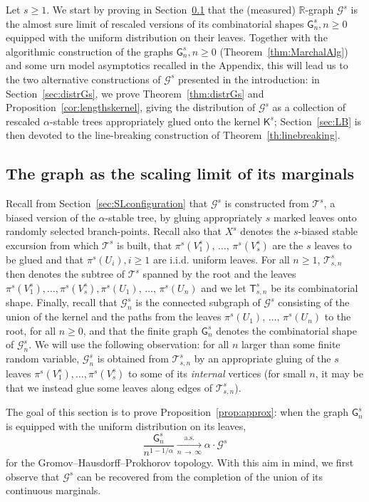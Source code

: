 \documentclass[10pt]{amsart}
\theoremstyle{definition}\newtheorem{defi}[theo]{Definition}\newtheorem{rema}[theo]{Remark}\newtheorem{exam}[theo]{Example}\newtheorem{exem}[theo]{Example}\newtheorem{nota}[theo]{Notation}
\newcommand{\cG}{\mathcal{G}}
\newcommand{\cT}{\mathcal{T}}
\newcommand{\sG}{\mathsf{G}}
\newcommand{\sT}{\mathsf{T}}
\newcommand{\sK}{\mathsf{K}}
\newcommand{\R}{\mathbb{R}}
\begin{document}
Let $s \geq 1$. We start by proving in Section~\ref{sec:approx} that the (measured) $\R$-graph $\cG^s$ is the almost sure limit of rescaled versions of its combinatorial shapes $\sG_n^s, n \geq 0$ equipped with the uniform distribution on their leaves. Together with the algorithmic construction of the graphs $\sG_n^s, n \geq 0$ (Theorem~\ref{thm:MarchalAlg}) and some urn model asymptotics recalled in the Appendix, this will lead us to the two alternative constructions of $\cG^s$ presented in the introduction: in Section~\ref{sec:distrGs}, we prove Theorem~\ref{thm:distrGs} and Proposition~\ref{cor:lengthskernel}, giving the distribution of $\cG^s$ as a collection of rescaled $\alpha$-stable trees appropriately glued onto the kernel $\sK^s$; Section~\ref{sec:LB} is then devoted to the line-breaking construction of Theorem~\ref{th:linebreaking}.


\subsection{The graph as the scaling limit of its marginals}\label{sec:approx}

Recall from Section~\ref{sec:SLconfiguration} that $\cG^s$ is constructed from $\cT^s$, a biased version of the $\alpha$-stable tree, by gluing appropriately $s$ marked leaves onto randomly selected branch-points. Recall also that $X^s$ denotes the $s$-biased stable excursion from which $\cT^s$ is built, that $\pi^s(V_1^s),\,\ldots,\,\pi^s(V_s^s)$ are the $s$ leaves to be glued and that $\pi^s(U_i), i \ge 1$ are i.i.d. uniform leaves. For all $n\geq 1$, $\cT^s_{s,n}$ then denotes the subtree of $\cT^s$ spanned by the root and the leaves $\pi^s(V_1^s), \ldots, \pi^s(V_s^s), \pi^s(U_1),\,\ldots,\, \pi^s(U_n)$ and we let $\sT^{s}_{s,n}$ be its combinatorial shape. Finally, recall that $\cG_n^s$ is the connected subgraph of $\cG^s$ consisting of the union of the kernel and the paths from the leaves $\pi^s(U_1),\,\ldots,\,\pi^s(U_n)$ to the root, for all $n \geq 0$, and that the finite graph $\sG_n^s$ denotes the combinatorial shape of $\cG_n^s$. We will use the following observation: for all $n$ larger than some finite random variable, $\cG_n^s$ is obtained from $\cT^s_{s,n}$ by an appropriate gluing of the $s$ leaves $\pi^s(V_1^s),\ldots,\pi^s(V_s^s)$ to some of its \emph{internal} vertices (for small $n$, it may be that we instead glue some leaves along edges of $\cT^s_{s,n}$).

The goal of this section is to prove Proposition~\ref{prop:approx}: when the graph $\sG_n^s$ is equipped with the uniform distribution on its leaves,
\begin{equation}\label{cv:GHPgraph}
\frac{\sG_n^s}{n^{1-1/\alpha}} \underset{n\, \rightarrow\,\infty}{\overset{\text{a.s.}}\longrightarrow} \alpha \cdot\cG^s
\end{equation}
for the Gromov--Hausdorff--Prokhorov topology. With this aim in mind, we first observe that $\cG^s$ can be recovered from the completion of the union of its continuous marginals.
\end{document}
